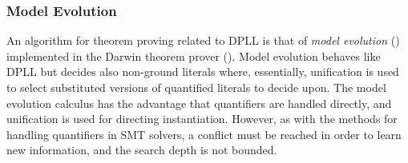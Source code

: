 \subsubsection*{Model Evolution}
An algorithm for theorem proving related to DPLL is that of \textit{model evolution} (\cite{BaumgartnerPelzerTinelli12}) implemented in the Darwin theorem prover (\cite{Fuchs:Darwin:Thesis:2004}). Model evolution behaves like DPLL but decides also non-ground literals where, essentially, unification is used to select substituted versions of quantified literals to decide upon. The model evolution calculus has the advantage that quantifiers are handled directly, and unification is used for directing instantiation. 
However, as with the methods for handling quantifiers in SMT solvers, a conflict must be reached in order to learn new information, and the search depth is not bounded.



